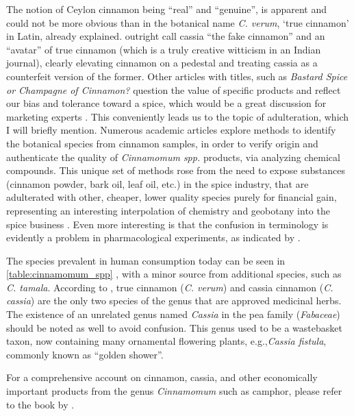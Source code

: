 The notion of Ceylon cinnamon being ``real'' and ``genuine'', is apparent and could not be more obvious than in the botanical name \textit{C. verum}, `true cinnamon' in Latin, already explained. \textcite{dinesh_controversies_2015} outright call cassia ``the fake cinnamon'' and an ``avatar'' of true cinnamon (which is a truly creative witticism in an Indian journal), clearly elevating cinnamon on a pedestal and treating cassia as a counterfeit version of the former. Other articles with titles, such as \textit{Bastard Spice or Champagne of Cinnamon?} question the value of specific products and reflect our bias and tolerance toward a spice, which would be a great discussion for marketing experts \autocite[see][]{derks_bastard_2020}.  
This conveniently leads us to the topic of adulteration, which I will briefly mention. Numerous academic articles explore methods to identify the botanical species from cinnamon samples, in order to verify origin and authenticate the quality of \textit{Cinnamomum spp.} products, via analyzing chemical compounds. This unique set of methods rose from the need to expose substances (cinnamon powder, bark oil, leaf oil, etc.) in the spice industry, that are adulterated with other, cheaper, lower quality species purely for financial gain, representing an interesting interpolation of chemistry and geobotany into the spice business \autocite[see][]{ford_cinnamon_2019}. Even more interesting is that the confusion in terminology is evidently a problem in pharmacological experiments, as indicated by \textcite{oketch-rabah_cinnamon_2018}.

The species prevalent in human consumption today can be seen in \cref{table:cinnamomum_spp} \autocite{kawatra_cinnamon_2015}, with a minor source from additional species, such as \textit{C. tamala}. According to \textcite{ulbricht_evidence-based_2011}, true cinnamon (\textit{C. verum}) and cassia cinnamon (\textit{C. cassia}) are the only two species of the genus that are approved medicinal herbs. The existence of an unrelated genus named \textit{Cassia} in the pea family (\textit{Fabaceae}) should be noted as well to avoid confusion. This genus used to be a wastebasket taxon, now containing many ornamental flowering plants, e.g.,\textit{Cassia fistula}, commonly known as ``golden shower''. 

For a comprehensive account on cinnamon, cassia, and other economically important products from the genus \textit{Cinnamomum} such as camphor, please refer to the book by \textcite{ravindran_cinnamon_2004}.

